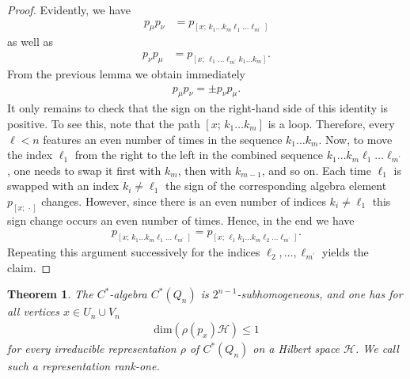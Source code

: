 \documentclass[a4paper]{amsart}
\newtheorem{thm}{Theorem}[section]
\begin{document}
\begin{proof}
    Evidently, we have
    \begin{align*}
        p_\mu p_\nu &= p_{[x; \, k_1 \dots k_m \ell_1 \dots \ell_{m^\prime}]}
    \end{align*}
    as well as
    \begin{align*}
        p_\nu p_\mu &= p_{[x; \, \ell_1 \dots \ell_{m^\prime} k_1 \dots k_m]}.
    \end{align*}
    From the previous lemma we obtain immediately
    \begin{align*}
        p_\mu p_\nu = \pm p_\nu p_\mu.
    \end{align*}
    It only remains to check that the sign on the right-hand side of this identity is positive. To see this, note that the path $[x; \, k_1 \dots k_m]$ is a loop. Therefore, every $\ell < n$ features an even number of times in the sequence $k_1 \dots k_m$. Now, to move the index $\ell_1$ from the right to the left in the combined sequence $k_1 \dots k_m \ell_1 \dots \ell_{m^\prime}$, one needs to swap it first with $k_m$, then with $k_{m-1}$, and so on. Each time $\ell_1$ is swapped with an index $k_i \neq \ell_1$ the sign of the corresponding algebra element $p_{[x; \, \cdot]}$ changes. However, since there is an even number of indices $k_i \neq \ell_1$ this sign change occurs an even number of times. Hence, in the end we have
    \begin{align*}
        p_{[x; \, k_1 \dots k_m \ell_1 \dots \ell_{m^\prime}]} = p_{[x; \, \ell_1 k_1 \dots k_m \ell_2 \dots \ell_{m^\prime}]}.
    \end{align*}
    Repeating this argument successively for the indices $\ell_2, \dots, \ell_{m^\prime}$ yields the claim.
\end{proof}

\begin{thm} 
    \label{hyp::thm:subhomogeneous:hypercube_algebra_is_subhomogeneous}
    The $C^\ast$-algebra $C^\ast(Q_n)$ is $2^{n-1}$-subhomogeneous, and one has for all vertices $x \in U_n \cup V_n$
    \begin{align}
        \label{sub::eq:rank_one_representations}
        \mathrm{dim}(\rho(p_x) \mathcal{H}) \leq 1
    \end{align}
    for every irreducible representation $\rho$ of $C^\ast(Q_n)$ on a Hilbert space $\mathcal{H}$. We call such a representation \emph{rank-one}. 
\end{thm}
\end{document}
